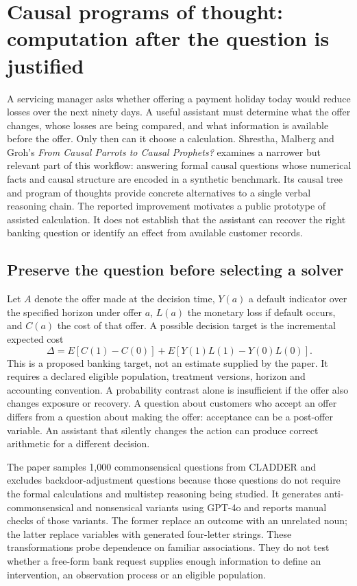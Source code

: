 \section{Causal programs of thought: computation after the question is justified}
\label{exec21:prophets-scope}
A servicing manager asks whether offering a payment holiday today would reduce
losses over the next ninety days. A useful assistant must determine what the offer
changes, whose losses are being compared, and what information is available before
the offer. Only then can it choose a calculation. Shrestha, Malberg and Groh's
\emph{From Causal Parrots to Causal Prophets?} examines a narrower but relevant
part of this workflow: answering formal causal questions whose numerical facts
and causal structure are encoded in a synthetic benchmark. Its causal tree and
program of thoughts provide concrete alternatives to a single verbal reasoning
chain. The reported improvement motivates a public prototype of assisted
calculation. It does not establish that the assistant can recover the right
banking question or identify an effect from available customer records.
\citep{exec21_prophets}

\subsection{Preserve the question before selecting a solver}
\label{exec21:prophets-question}
Let $A$ denote the offer made at the decision time, $Y(a)$ a default indicator
over the specified horizon under offer $a$, $L(a)$ the monetary loss if default
occurs, and $C(a)$ the cost of that offer. A possible decision target is the
incremental expected cost
\[
 \Delta=E[C(1)-C(0)]+E[Y(1)L(1)-Y(0)L(0)].
\]
This is a proposed banking target, not an estimate supplied by the paper. It
requires a declared eligible population, treatment versions, horizon and
accounting convention. A probability contrast alone is insufficient if the
offer also changes exposure or recovery. A question about customers who accept
an offer differs from a question about making the offer: acceptance can be a
post-offer variable. An assistant that silently changes the action can produce
correct arithmetic for a different decision.

The paper samples 1,000 commonsensical questions from CLADDER and excludes
backdoor-adjustment questions because those questions do not require the
formal calculations and multistep reasoning being studied. It generates
anti-commonsensical and nonsensical variants using GPT-4o and reports manual
checks of those variants. The former replace an outcome with an unrelated
noun; the latter replace variables with generated four-letter strings. These
transformations probe dependence on familiar associations. They do not test
whether a free-form bank request supplies enough information to define an
intervention, an observation process or an eligible population.
\citep{exec21_prophets}

